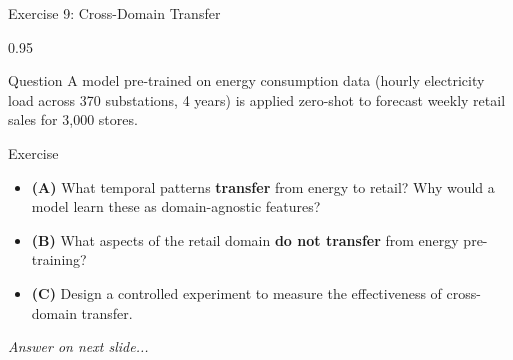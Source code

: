 \documentclass[9pt, aspectratio=169, t]{beamer}
\begin{document}
\begin{frame}{Exercise 9: Cross-Domain Transfer}
    \begin{cminipage}{0.95\textwidth}
    \begin{alertblock}{Question}
        A model pre-trained on energy consumption data (hourly electricity load across 370 substations, 4 years) is applied zero-shot to forecast weekly retail sales for 3{,}000 stores.
    \end{alertblock}

    \vspace{0.2cm}

    \begin{block}{Exercise}
        \begin{itemize}\setlength{\itemsep}{3pt}
            \item \textcolor{MainBlue}{\textbf{(A)}} What temporal patterns \textbf{transfer} from energy to retail? Why would a model learn these as domain-agnostic features?
            \item \textcolor{MainBlue}{\textbf{(B)}} What aspects of the retail domain \textbf{do not transfer} from energy pre-training?
            \item \textcolor{MainBlue}{\textbf{(C)}} Design a controlled experiment to measure the effectiveness of cross-domain transfer.
        \end{itemize}
    \end{block}

    \vspace{0.2cm}

    \begin{center}
        \textit{Answer on next slide...}
    \end{center}
    \end{cminipage}
\end{frame}
\end{document}
